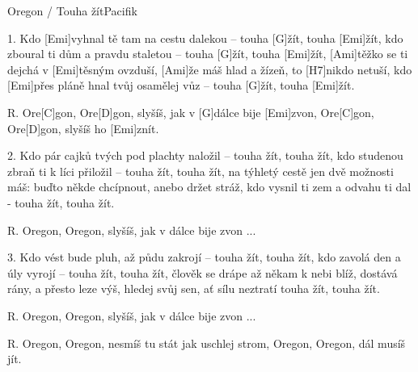\begin{song}{Oregon / Touha žít}{Pacifik}

\begin{xverse}{1. }
Kdo [Emi]vyhnal tě tam na cestu dalekou --
touha [G]{}žít, touha [Emi]{}žít,
kdo zboural ti dům a pravdu staletou --
touha [G]{}žít, touha [Emi]{}žít,
[Ami]těžko se ti dejchá v [Emi]těsným ovzduší,
[Ami]{}že máš hlad a žízeň, to [H7]nikdo netuší,
kdo [Emi]přes pláně hnal tvůj osamělej vůz --
touha [G]{}žít, touha [Emi]{}žít.
\end{xverse}

\begin{xverse}{R. }
Ore[C]gon, Ore[D]gon, slyšíš, jak v [G]dálce bije [Emi]zvon,
Ore[C]gon, Ore[D]gon, slyšíš ho [Emi]znít.
\end{xverse}

\begin{xverse}{2. }
Kdo pár cajků tvých pod plachty naložil --
 touha žít, touha žít,
kdo studenou zbraň ti k líci přiložil --
 touha žít, touha žít,
na týhletý cestě jen dvě možnosti máš:
buďto někde chcípnout, anebo držet stráž,
kdo vysnil ti zem a odvahu ti dal - touha žít, touha žít.
\end{xverse}

\begin{xverse}{R. }
Oregon, Oregon, slyšíš, jak v dálce bije zvon ...
\end{xverse}

\begin{xverse}{3. }
Kdo vést bude pluh, až půdu zakrojí --
 touha žít, touha žít,
kdo zavolá den a úly vyrojí --
 touha žít, touha žít,
člověk se drápe až někam k nebi blíž,
dostává rány, a přesto leze výš,
hledej svůj sen, ať sílu neztratí touha žít, touha žít.
\end{xverse}

\begin{xverse}{R. }
Oregon, Oregon, slyšíš, jak v dálce bije zvon ...
\end{xverse}

\begin{xverse}{R. }
Oregon, Oregon, nesmíš tu stát jak uschlej strom,
Oregon, Oregon, dál musíš jít.
\end{xverse}

\end{song}

